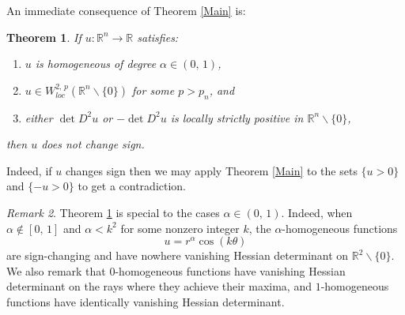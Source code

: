 \documentclass{amsart}
\newtheorem{thm}{Theorem}[section]
\theoremstyle{definition}
\theoremstyle{remark}
\newtheorem{rem}[thm]{Remark}
\begin{document}
An immediate consequence of Theorem \ref{Main} is:

\begin{thm}\label{Main2}
If $u: \mathbb{R}^n \rightarrow \mathbb{R}$ satisfies:
\begin{enumerate}[label=(\roman*)]
\item $u$ is homogeneous of degree $\alpha \in (0,\,1)$,
\item $u \in W^{2,\,p}_{loc}\left(\mathbb{R}^n \backslash \{0\}\right)$ for some $p > p_n$, and
\item either $\det D^2u$ or $-\det D^2u$ is locally strictly positive in $\mathbb{R}^n \backslash \{0\}$,
\end{enumerate}
then $u$ does not change sign.
\end{thm}
\noindent Indeed, if $u$ changes sign then we may apply Theorem \ref{Main} to the sets $\{u > 0\}$ and $\{-u > 0\}$ to get a contradiction.

\begin{rem} 
Theorem \ref{Main2} is special to the cases $\alpha \in (0,\,1)$. Indeed, when $\alpha \notin [0,\,1]$ and $\alpha < k^2$ for some nonzero integer $k$, the $\alpha$-homogeneous functions
$$u = r^{\alpha}\cos(k\theta)$$
are sign-changing and have nowhere vanishing Hessian determinant on $\mathbb{R}^2 \backslash \{0\}$. We also remark that $0$-homogeneous functions have vanishing Hessian determinant on the rays where they achieve their maxima, and $1$-homogeneous functions have identically vanishing Hessian determinant. 
\end{rem}
\end{document}
